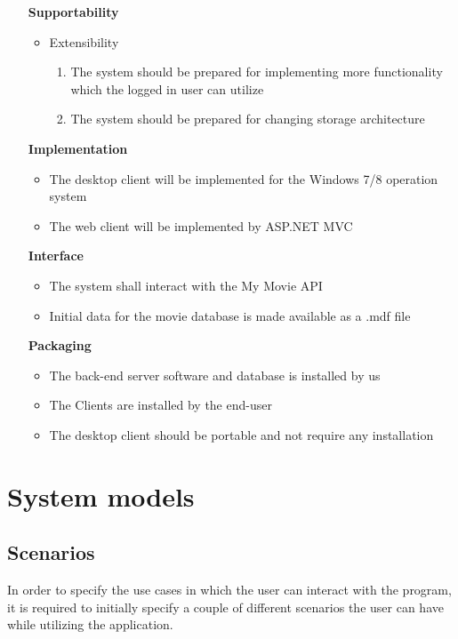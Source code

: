 \begin{itemize}
\vspace{0.2cm}
\item[\textbf{Supportability}]
\begin{itemize}
\item Extensibility
\begin{enumerate}
\item The system should be prepared for implementing more functionality which the logged in user can utilize
\item The system should be prepared for changing storage architecture
\end{enumerate}
\end{itemize}

\vspace{0.2cm}
\item[\textbf{Implementation}]
\begin{itemize}
\item The desktop client will be implemented for the Windows 7/8 operation system
\item The web client will be implemented by ASP.NET MVC
\end{itemize}

\vspace{0.2cm}
\item[\textbf{Interface}]
\begin{itemize}
\item The system shall interact with the My Movie API
\item Initial data for the movie database is made available as a .mdf file
\end{itemize}

\vspace{0.2cm}
\item[\textbf{Packaging}]
\begin{itemize}
\item The back-end server software and database is installed by us
\item The Clients are installed by the end-user
\item The desktop client should be portable and not require any installation
\end{itemize}

\end{itemize}


\section{System models}

\subsection{Scenarios}
In order to specify the use cases in which the user can interact with the program, it is required to initially specify a couple of different scenarios the user can have while utilizing the application.


